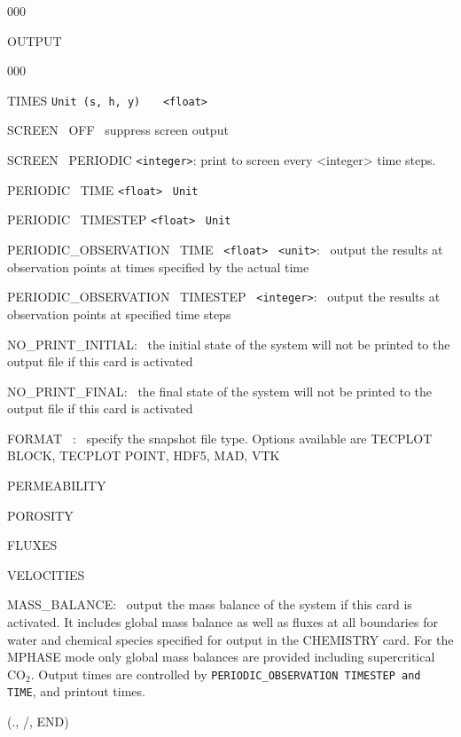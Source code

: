 \documentclass[12pt]{article}
\begin{document}
\begin{deflist}{000}
\item[OUTPUT] ~
\begin{deflist}{000}
\item[TIMES] {\tt Unit (s, h, y)} \ \ \ {\tt <float>} 
\item[SCREEN \ OFF] \ suppress screen output
\item[SCREEN \ PERIODIC] {\tt <integer>}: print to screen every <integer> time steps.
\item[PERIODIC \ TIME] {\tt <float>} \ {\tt Unit}
\item[PERIODIC \ TIMESTEP] {\tt <float>} \ {\tt Unit}
\item[PERIODIC\_OBSERVATION \ TIME] \ {\tt <float>} \ {\tt <unit>}: \ output the results at observation points at times specified by the actual time
\item[PERIODIC\_OBSERVATION \ TIMESTEP] \ {\tt <integer>}: \ output the results at observation points at specified time steps 
\item[NO\_PRINT\_INITIAL:] \ the initial state of the system will not be printed to the output file if this card is activated
\item[NO\_PRINT\_FINAL:] \ the final state of the system will not be printed to the output file if this card is activated
\item[FORMAT] \ <file format>: \ specify the snapshot file type. Options available are TECPLOT BLOCK, TECPLOT POINT, HDF5, MAD, VTK
\item[PERMEABILITY]
\item[POROSITY]
\item[FLUXES]
\item[VELOCITIES]
\item[MASS\_BALANCE:] \ output the mass balance of the system if this card is activated. It includes global mass balance as well as fluxes at all boundaries for water and chemical species specified for output in the CHEMISTRY card. For the MPHASE mode only global mass balances are provided including supercritical CO$_2$. Output times are controlled by {\tt PERIODIC\_OBSERVATION TIMESTEP and TIME}, and printout times.
\end{deflist}
\item[(., /, END)]
\end{deflist}
\end{document}
